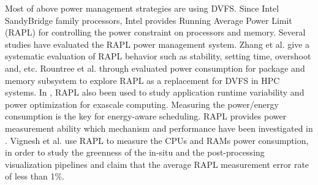 Most of above power management strategies are using DVFS. Since Intel SandyBridge family processors, Intel provides Running Average Power Limit (RAPL) for controlling the power constraint on processors and memory. Several studies have evaluated the RAPL power management system. Zhang et al. \cite{zhang2015quantitative} give a systematic evaluation of RAPL behavior such as stability, setting time, overshoot and, etc. Rountree et al. \cite{rountree2012beyond} through evaluated power consumption for package and memory subsystem to explore RAPL as a replacement for DVFS in HPC systems. In \cite{porterfield2015application}\cite{sarood2013optimizing}, RAPL also been used to study application runtime variability and power optimization for exascale computing.
Measuring the power/energy consumption is the key for energy-aware scheduling. RAPL provides power measurement ability which mechanism and performance have been investigated in \cite{porterfield2015application} \cite{hahnel2012measuring}. Vignesh et al. \cite{adhinarayanan2015greenness} use RAPL to measure the CPUs and RAMs power consumption, in order to study the greenness of the in-situ and the post-processing visualization pipelines and claim that the average RAPL measurement error rate of less than 1\%. 










